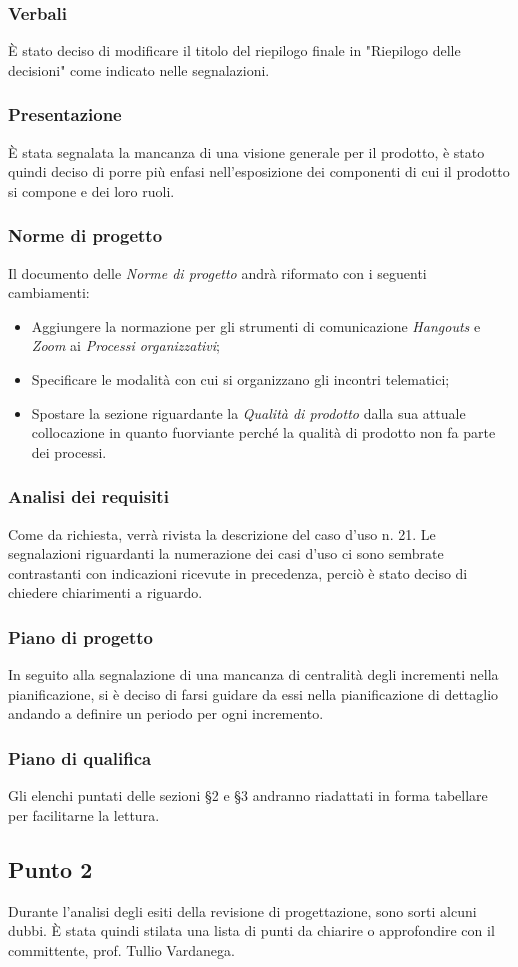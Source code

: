         \subsubsection{Verbali}
            È stato deciso di modificare il titolo del riepilogo finale in "Riepilogo delle decisioni" come indicato nelle segnalazioni.
        \subsubsection{Presentazione}
            È stata segnalata la mancanza di una visione generale per il prodotto\glo, è stato quindi deciso di porre più enfasi nell'esposizione dei componenti di cui il prodotto si compone e dei loro ruoli.
        \subsubsection{Norme di progetto}
            Il documento delle \textit{Norme di progetto} andrà riformato con i seguenti cambiamenti:
            \begin{itemize}
                \item Aggiungere la normazione per gli strumenti di comunicazione \textit{Hangouts} e \textit{Zoom} ai \textit{Processi organizzativi};
                \item  Specificare le modalità con cui si organizzano gli incontri telematici;
                \item Spostare la sezione riguardante la \textit{Qualità di prodotto} dalla sua attuale collocazione in quanto fuorviante perché la qualità di prodotto non fa parte dei processi.
            \end{itemize}
        \subsubsection{Analisi dei requisiti}
            Come da richiesta, verrà rivista la descrizione del caso d'uso n. 21. Le segnalazioni riguardanti la numerazione dei casi d'uso ci sono sembrate contrastanti con indicazioni ricevute in precedenza, perciò è stato deciso di chiedere chiarimenti a riguardo.
        \subsubsection{Piano di progetto}
            In seguito alla segnalazione di una mancanza di centralità degli incrementi nella pianificazione, si è deciso di farsi guidare da essi nella pianificazione di dettaglio andando a definire un periodo per ogni incremento.
        \subsubsection{Piano di qualifica}
            Gli elenchi puntati delle sezioni §2 e §3 andranno riadattati in forma tabellare per facilitarne la lettura.
    \subsection{Punto 2}
        Durante l'analisi degli esiti della revisione di progettazione, sono sorti alcuni dubbi. È stata quindi stilata una lista di punti da chiarire o approfondire con il committente, prof. Tullio Vardanega.
